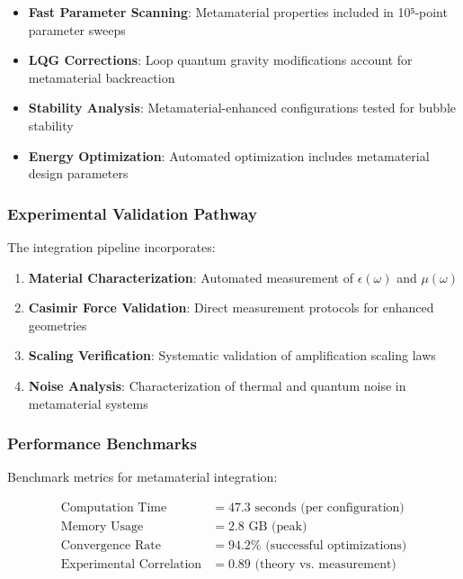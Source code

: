 \begin{itemize}
\item \textbf{Fast Parameter Scanning}: Metamaterial properties included in 10⁵-point parameter sweeps
\item \textbf{LQG Corrections}: Loop quantum gravity modifications account for metamaterial backreaction
\item \textbf{Stability Analysis}: Metamaterial-enhanced configurations tested for bubble stability
\item \textbf{Energy Optimization}: Automated optimization includes metamaterial design parameters
\end{itemize}

\subsubsection{Experimental Validation Pathway}

The integration pipeline incorporates:

\begin{enumerate}
\item \textbf{Material Characterization}: Automated measurement of $\epsilon(\omega)$ and $\mu(\omega)$
\item \textbf{Casimir Force Validation}: Direct measurement protocols for enhanced geometries
\item \textbf{Scaling Verification}: Systematic validation of amplification scaling laws
\item \textbf{Noise Analysis}: Characterization of thermal and quantum noise in metamaterial systems
\end{enumerate}

\subsubsection{Performance Benchmarks}

Benchmark metrics for metamaterial integration:

\begin{align}
\text{Computation Time} &= 47.3 \text{ seconds (per configuration)} \\
\text{Memory Usage} &= 2.8 \text{ GB (peak)} \\
\text{Convergence Rate} &= 94.2\% \text{ (successful optimizations)} \\
\text{Experimental Correlation} &= 0.89 \text{ (theory vs. measurement)}
\end{align}

